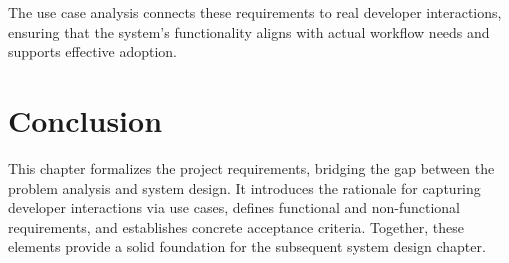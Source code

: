 \begin{spacing}{1.2}
The use case analysis connects these requirements to real developer interactions, ensuring that the system’s functionality aligns with actual workflow needs and supports effective adoption.

\section*{Conclusion}

This chapter formalizes the project requirements, bridging the gap between the problem analysis and system design. It introduces the rationale for capturing developer interactions via use cases, defines functional and non-functional requirements, and establishes concrete acceptance criteria. Together, these elements provide a solid foundation for the subsequent system design chapter.






\end{spacing}


